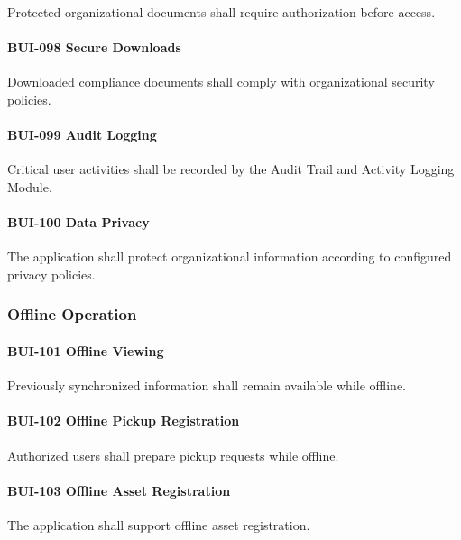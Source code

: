 Protected organizational documents shall require authorization before
access.

\paragraph{BUI-098 Secure Downloads}

Downloaded compliance documents shall comply with organizational
security policies.

\paragraph{BUI-099 Audit Logging}

Critical user activities shall be recorded by the Audit Trail and
Activity Logging Module.

\paragraph{BUI-100 Data Privacy}

The application shall protect organizational information according to
configured privacy policies.


\subsubsection*{Offline Operation}

\paragraph{BUI-101 Offline Viewing}

Previously synchronized information shall remain available while
offline.

\paragraph{BUI-102 Offline Pickup Registration}

Authorized users shall prepare pickup requests while offline.

\paragraph{BUI-103 Offline Asset Registration}

The application shall support offline asset registration.

